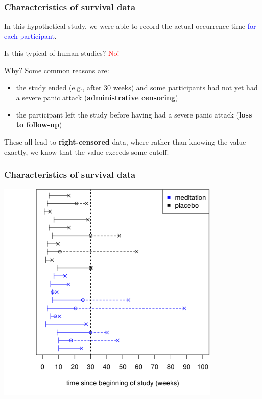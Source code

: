 \documentclass[12pt, 
hyperref={colorlinks=true, linkcolor=blue, urlcolor=cyan},dvipsnames]{beamer}
\begin{document}
\begin{frame}
\frametitle{Characteristics of survival data}
In this hypothetical study, we were able to record the actual occurrence time \textcolor{blue}{for each participant}.

Is this typical of human studies? \pause \textcolor{red}{No!}

Why? \pause Some common reasons are:
\begin{itemize}
\item the study ended (e.g., after 30 weeks) and some participants had not yet had a severe panic attack (\textbf{administrative censoring})
\item the participant left the study before having had a severe panic attack (\textbf{loss to follow-up})
\end{itemize}

These all lead to \textbf{right-censored} data, where rather than knowing the value exactly, we know that the value exceeds some cutoff.
\end{frame}

\begin{frame}
\frametitle{Characteristics of survival data}
\centering
\includegraphics[width=0.8\textwidth]{figs/meditation_censored_study_time.png}
\end{frame}
\end{document}
